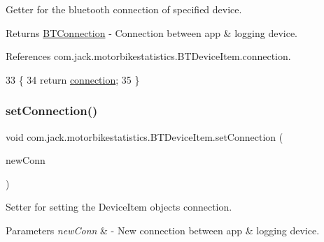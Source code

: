 Getter for the bluetooth connection of specified device. 

\begin{DoxyReturn}{Returns}
\hyperlink{classcom_1_1jack_1_1motorbikestatistics_1_1_b_t_connection}{B\+T\+Connection} -\/ Connection between app \& logging device. 
\end{DoxyReturn}


References com.\+jack.\+motorbikestatistics.\+B\+T\+Device\+Item.\+connection.


\begin{DoxyCode}
33                                         \{
34         \textcolor{keywordflow}{return} \hyperlink{classcom_1_1jack_1_1motorbikestatistics_1_1_b_t_device_item_a38830528ad49afd7ba09ced7ab55d6dc}{connection};
35     \}
\end{DoxyCode}
\mbox{\label{classcom_1_1jack_1_1motorbikestatistics_1_1_b_t_device_item_a96f7261d9eab97d74569fbc3b0da4f28}} 
\subsubsection{\texorpdfstring{set\+Connection()}{setConnection()}}
{\footnotesize\ttfamily void com.\+jack.\+motorbikestatistics.\+B\+T\+Device\+Item.\+set\+Connection (\begin{DoxyParamCaption}\item[{\hyperlink{classcom_1_1jack_1_1motorbikestatistics_1_1_b_t_connection}{B\+T\+Connection}}]{new\+Conn }\end{DoxyParamCaption})\hspace{0.3cm}{\ttfamily [inline]}}



Setter for setting the Device\+Item object\textquotesingle{}s connection. 


\begin{DoxyParams}{Parameters}
{\em new\+Conn} & -\/ New connection between app \& logging device. \\
\hline
\end{DoxyParams}

